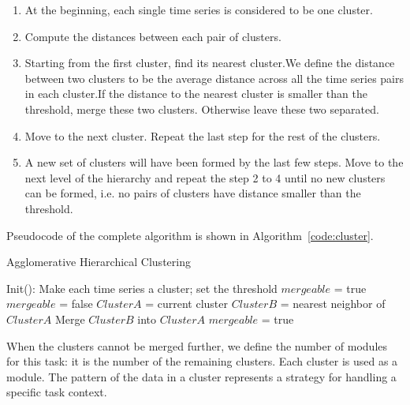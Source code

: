 \begin{enumerate}
\item At the beginning, each single time series is considered to be one cluster.
\item Compute the distances between each pair of clusters.
\item Starting from the first cluster, find its nearest cluster.We define the distance between two clusters to be the average distance across all the time series pairs in each cluster.If the distance to the nearest cluster is smaller than the threshold, merge these two clusters. Otherwise leave these two separated.
\item Move to the next cluster. Repeat the last step for the rest of the clusters.
\item A new set of clusters will have been formed by the last few steps. Move to the next level of the hierarchy and repeat the step 2 to 4 until no new clusters can be formed, i.e. no pairs of clusters have distance smaller than the threshold.
\end{enumerate}

Pseudocode of the complete algorithm is shown in Algorithm~\ref{code:cluster}.

\begin{algorithm}
  \caption{Agglomerative Hierarchical Clustering}
  \begin{algorithmic}[1]
    \State Init(): Make each time series a cluster; set the threshold\;
    \State $mergeable$ = true\;
      \State $mergeable$ = false\;
        \State $ClusterA$ = current cluster\;
        \State $ClusterB$ = nearest neighbor of $ClusterA$\;
            \State Merge $ClusterB$ into $ClusterA$\;
            \State $mergeable$ = true\;
        \EndIf
      \EndFor
    \EndWhile
    \EndFunction
  \end{algorithmic}
  \label{code:cluster}
\end{algorithm}

When the clusters cannot be merged further, we define the number of modules for this task: it is the number of the remaining
clusters. Each cluster is used as a module. The pattern of the data in a cluster represents a strategy for handling a specific task context.



